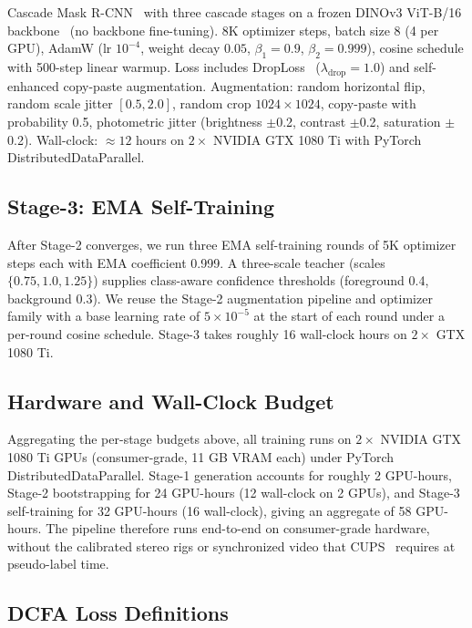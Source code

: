 \documentclass{article}
\begin{document}
Cascade Mask R-CNN~\cite{cai2018cascade} with three cascade stages on a frozen DINOv3 ViT-B/16 backbone~\cite{simeoni2025dinov3} (no backbone fine-tuning). 8K optimizer steps, batch size 8 (4 per GPU), AdamW (lr $10^{-4}$, weight decay $0.05$, $\beta_1{=}0.9$, $\beta_2{=}0.999$), cosine schedule with 500-step linear warmup. Loss includes DropLoss~\cite{wang2023cutler} ($\lambda_\text{drop}{=}1.0$) and self-enhanced copy-paste augmentation. Augmentation: random horizontal flip, random scale jitter $[0.5, 2.0]$, random crop $1024\times1024$, copy-paste with probability 0.5, photometric jitter (brightness $\pm$0.2, contrast $\pm$0.2, saturation $\pm$0.2). Wall-clock: $\approx 12$ hours on $2\times$ NVIDIA GTX 1080 Ti with PyTorch DistributedDataParallel.

\subsection{Stage-3: EMA Self-Training}
\label{sec:supp:impl:stage3}

After Stage-2 converges, we run three EMA self-training rounds of 5K optimizer steps each with EMA coefficient 0.999. A three-scale teacher (scales $\{0.75, 1.0, 1.25\}$) supplies class-aware confidence thresholds (foreground 0.4, background 0.3). We reuse the Stage-2 augmentation pipeline and optimizer family with a base learning rate of $5\times10^{-5}$ at the start of each round under a per-round cosine schedule. Stage-3 takes roughly 16 wall-clock hours on $2\times$ GTX 1080 Ti.

\subsection{Hardware and Wall-Clock Budget}
\label{sec:supp:impl:hardware}

Aggregating the per-stage budgets above, all training runs on $2\times$ NVIDIA GTX 1080 Ti GPUs (consumer-grade, 11 GB VRAM each) under PyTorch DistributedDataParallel. Stage-1 generation accounts for roughly 2 GPU-hours, Stage-2 bootstrapping for 24 GPU-hours (12 wall-clock on 2 GPUs), and Stage-3 self-training for 32 GPU-hours (16 wall-clock), giving an aggregate of 58 GPU-hours. The pipeline therefore runs end-to-end on consumer-grade hardware, without the calibrated stereo rigs or synchronized video that CUPS~\cite{hahn2025cups} requires at pseudo-label time.

\subsection{DCFA Loss Definitions}
\label{sec:supp:impl:dcfa_loss}
\end{document}
